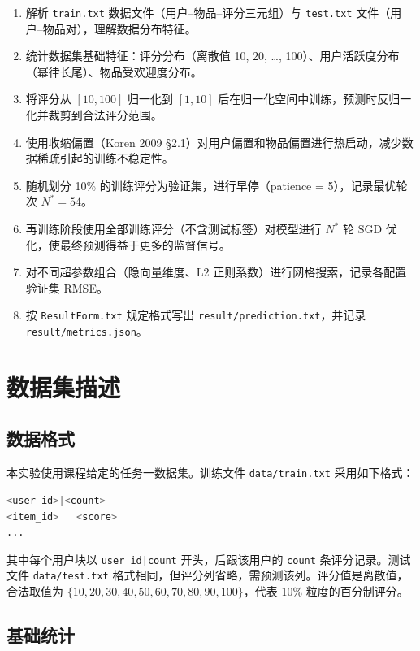 \documentclass[UTF8,a4paper,10pt]{ctexart}
\newcommand{\xiaosi}{\fontsize{12pt}{20pt}\selectfont}
\begin{document}
\begin{enumerate}
  \item 解析 \texttt{train.txt} 数据文件（用户--物品--评分三元组）与 \texttt{test.txt} 文件（用户--物品对），理解数据分布特征。
  \item 统计数据集基础特征：评分分布（离散值 10, 20, \ldots, 100）、用户活跃度分布（幂律长尾）、物品受欢迎度分布。
  \item 将评分从 $[10, 100]$ 归一化到 $[1, 10]$ 后在归一化空间中训练，预测时反归一化并裁剪到合法评分范围。
  \item 使用收缩偏置（Koren 2009 §2.1）对用户偏置和物品偏置进行热启动，减少数据稀疏引起的训练不稳定性。
  \item 随机划分 10\% 的训练评分为验证集，进行早停（patience = 5），记录最优轮次 $N^* = 54$。
  \item 再训练阶段使用全部训练评分（不含测试标签）对模型进行 $N^*$ 轮 SGD 优化，使最终预测得益于更多的监督信号。
  \item 对不同超参数组合（隐向量维度、L2 正则系数）进行网格搜索，记录各配置验证集 RMSE。
  \item 按 \texttt{ResultForm.txt} 规定格式写出 \texttt{result/prediction.txt}，并记录 \texttt{result/metrics.json}。
\end{enumerate}

\section{数据集描述}
\xiaosi

\subsection{数据格式}

本实验使用课程给定的任务一数据集。训练文件 \texttt{data/train.txt} 采用如下格式：

\begin{lstlisting}[language=bash, caption={train.txt 数据格式}]
<user_id>|<count>
<item_id>   <score>
...
\end{lstlisting}

其中每个用户块以 \texttt{user\_id|count} 开头，后跟该用户的 \texttt{count} 条评分记录。测试文件 \texttt{data/test.txt} 格式相同，但评分列省略，需预测该列。评分值是离散值，合法取值为 $\{10, 20, 30, 40, 50, 60, 70, 80, 90, 100\}$，代表 10\% 粒度的百分制评分。

\subsection{基础统计}
\end{document}

